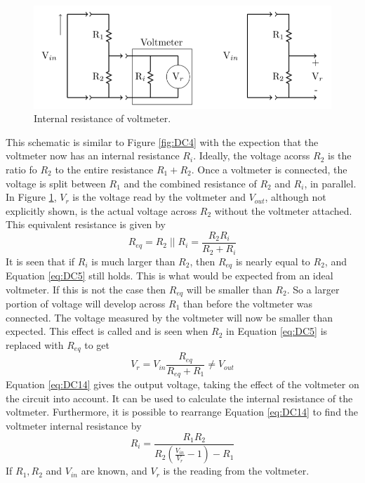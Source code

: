 \begin{figure}[H]
    \centering
    \includegraphics[scale = 0.8]{Images/DC10.PNG}
    \caption{Internal resistance of voltmeter.}
    \label{fig:DC10}
\end{figure}

This schematic is similar to Figure \ref{fig:DC4} with the expection that the voltmeter now has an internal resistance $R_i$. Ideally, the voltage acorss $R_2$ is the ratio fo $R_2$ to the entire resistance $R_1+R_2$. Once a voltmeter is connected, the voltage is split between $R_1$ and the combined resistance of $R_2$ and $R_i$, in parallel. In Figure \ref{fig:DC10}, $V_r$ is the voltage read by the voltmeter and $V_{out}$, although not explicitly shown, is the actual voltage across $R_2$ without the voltmeter attached. This equivalent resistance is given by \begin{equation}\label{eq:DC13}
    R_{eq} = R_2\;\vert\vert\;R_i = \frac{R_2R_i}{R_2+R_i}
\end{equation}
It is seen that if $R_i$ is much larger than $R_2$, then $R_{eq}$ is nearly equal to $R_2$, and Equation \ref{eq:DC5} still holds. This is what would be expected from an ideal voltmeter. If this is not the case then $R_{eq}$ will be smaller than $R_2$. So a larger portion of voltage will develop across $R_1$ than before the voltmeter was connected. The voltage measured by the voltmeter will now be smaller than expected. This effect is called  and is seen when $R_2$ in Equation \ref{eq:DC5} is replaced with $R_{eq}$ to get \begin{equation}\label{eq:DC14}
    V_r = V_{in}\frac{R_{eq}}{R_{eq}+R_1} \neq V_{out}
\end{equation}
Equation \ref{eq:DC14} gives the output voltage, taking the effect of the voltmeter on the circuit into account. It can be used to calculate the internal resistance of the voltmeter. Furthermore, it is possible to rearrange Equation \ref{eq:DC14} to find the voltmeter internal resistance by \begin{equation}\label{eq:DC15}
    R_i = \frac{R_1R_2}{R_2\left(\frac{V_{in}}{V_r}-1\right)-R_1}
\end{equation}
If $R_1,R_2$ and $V_{in}$ are known, and $V_r$ is the reading from the voltmeter.

